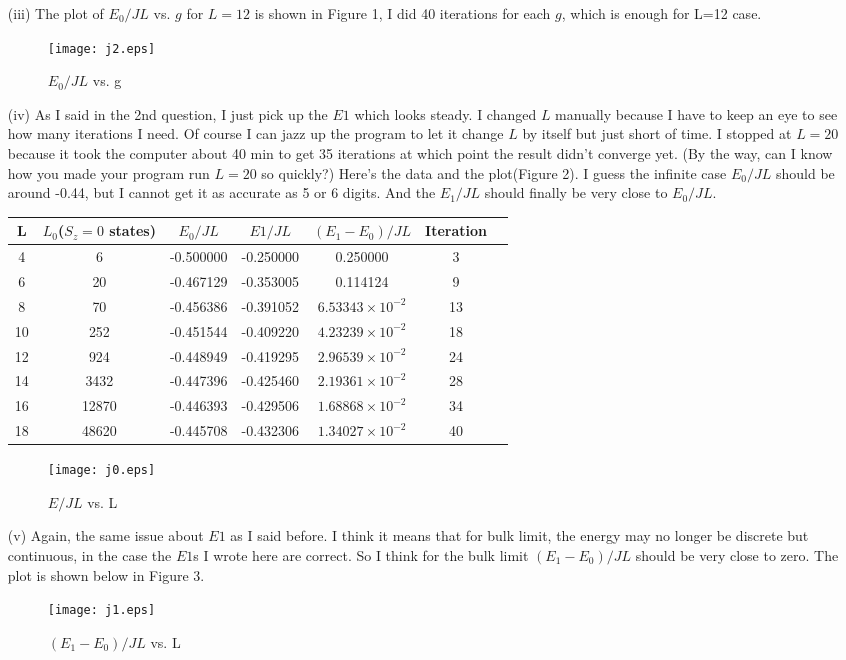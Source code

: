 \documentclass{article}
\begin{document}
\begin{enumerate}
\vskip 1cm
\item[(iii)]
The plot of $E_0/JL$ vs. $g$ for $L=12$ is shown in Figure 1, I did 40 iterations for each $g$, which is enough for L=12 case.
  \begin{figure}[ht]
   \begin{center}
   {\texttt{[image: j2.eps]}}
   \caption{$E_0/JL$ vs. g}
   \end{center}
  \end{figure}	
\vskip 1cm
\item[(iv)]
As I said in the 2nd question, I just pick up the $E1$ which looks steady.  I changed $L$ manually because I have to keep an eye to see how many iterations I need.  Of course I can jazz up the program to let it change $L$ by itself but just short of time.  I stopped at $L=20$ because it took the computer about 40 min to get 35 iterations at which point the result didn't converge yet.  (By the way, can I know how you made your program run $L=20$ so quickly?) 
Here's the data and the plot(Figure 2).  I guess the infinite case $E_0/JL$ should be around -0.44, but I cannot get it as accurate as 5 or 6 digits.  And the $E_1/JL$ should finally be very close to $E_0/JL$.
\begin{center}
\begin{tabular}{ccccccc}
L&$L_0$($S_z=0$ states)&$E_0/JL$&$E1/JL$&$(E_1-E_0)/JL$&Iteration\\\hline
4&6&-0.500000&-0.250000&0.250000&3\\
6&20&-0.467129&-0.353005&0.114124&9\\
8&70&-0.456386&-0.391052&$6.53343\times 10^{-2}$&13\\
10&252&-0.451544&-0.409220&$4.23239\times 10^{-2}$&18\\
12&924&-0.448949&-0.419295&$2.96539\times 10^{-2}$&24\\
14&3432&-0.447396&-0.425460&$2.19361\times 10^{-2}$&28\\
16&12870&-0.446393&-0.429506&$1.68868\times 10^{-2}$&34\\
18&48620&-0.445708&-0.432306&$1.34027\times 10^{-2}$&40
\end{tabular}
\end{center}
  \begin{figure}[ht]
   \begin{center}
   {\texttt{[image: j0.eps]}}
   \caption{$E/JL$ vs. L}
   \end{center}
  \end{figure}	
\vskip 1cm
\item[(v)]
Again, the same issue about $E1$ as I said before.  I think it means that for bulk limit, the energy may no longer be discrete but continuous, in the case the $E1$s I wrote here are correct.  So I think for the bulk limit $(E_1-E_0)/JL$ should be very close to zero.
The plot is shown below in Figure 3.
  \begin{figure}[ht]
   \begin{center}
   {\texttt{[image: j1.eps]}}
   \caption{$(E_1-E_0)/JL$ vs. L}
   \end{center}
  \end{figure}
\end{enumerate}
\end{document}
